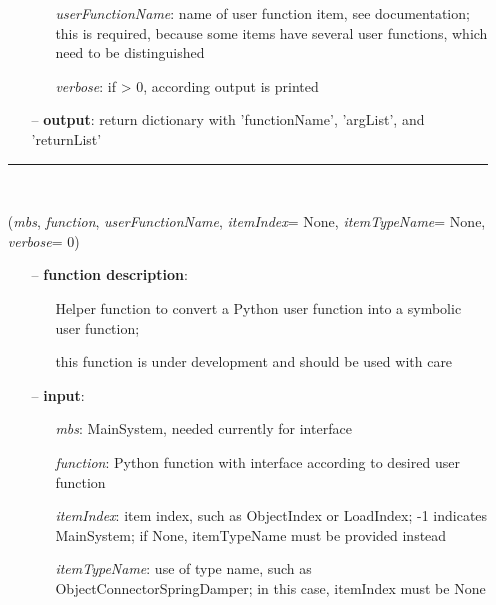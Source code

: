 \begin{itemize}[leftmargin=1.4cm]
\begin{itemize}[leftmargin=0.7cm]
\begin{itemize}[leftmargin=1.2cm]
\item[]{\it userFunctionName}: name of user function item, see documentation; this is required, because some items have several user functions, which need to be distinguished
\item[]{\it verbose}: if > 0, according output is printed
\end{itemize}
\item[--]
{\bf output}: return dictionary with 'functionName', 'argList', and 'returnList'
\vspace{12pt}\end{itemize}
%
\noindent\rule{8cm}{0.75pt}\vspace{1pt} \\ 
\begin{flushleft}
\label{sec:advancedUtilities:CreateSymbolicUserFunction}
({\it mbs}, {\it function}, {\it userFunctionName}, {\it itemIndex}= None, {\it itemTypeName}= None, {\it verbose}= 0)
\end{flushleft}
\setlength{\itemindent}{0.7cm}
\begin{itemize}[leftmargin=0.7cm]
\item[--]
{\bf function description}: \vspace{-6pt}
\begin{itemize}[leftmargin=1.2cm]
\setlength{\itemindent}{-0.7cm}
\item[]Helper function to convert a Python user function into a symbolic user function;
\item[]this function is under development and should be used with care
\end{itemize}
\item[--]
{\bf input}: \vspace{-6pt}
\begin{itemize}[leftmargin=1.2cm]
\setlength{\itemindent}{-0.7cm}
\item[]{\it mbs}: MainSystem, needed currently for interface
\item[]{\it function}: Python function with interface according to desired user function
\item[]{\it itemIndex}: item index, such as ObjectIndex or LoadIndex; -1 indicates MainSystem; if None, itemTypeName must be provided instead
\item[]{\it itemTypeName}: use of type name, such as ObjectConnectorSpringDamper; in this case, itemIndex must be None

\end{itemize}
\end{itemize}
\end{itemize}
